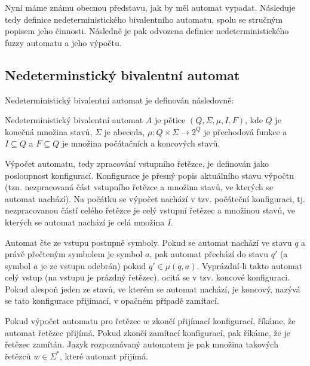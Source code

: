 \documentclass[a4paper,10pt]{article}
\begin{document}
Nyní máme známu obecnou představu, jak by měl automat vypadat. Následuje tedy definice nedeterministického bivalentního automatu, spolu se stručným popisem jeho činnosti. Následně je pak odvozena definice nedeterministického fuzzy automatu a jeho výpočtu.


\subsection{Nedeterminstický bivalentní automat}
Nedeterministický bivalentní automat je definován následovně:

\begin{definition}\label{def-NedBivAut}
 Nedeterministický bivalentní automat $A$ je pětice $(Q, \Sigma, \mu, I, F)$, kde $Q$ je konečná množina stavů, $\Sigma$ je abeceda, $\mu: Q \times \Sigma \rightarrow 2^Q$ je přechodová funkce a $I \subseteq Q$ a $F \subseteq Q$ je množina počátačních a koncových stavů.
\end{definition}


Výpočet automatu, tedy zpracování vstupního řetězce, je definován jako posloupnost konfigurací. Konfigurace je přesný popis aktuálního stavu výpočtu (tzn. nezpracovaná část vstupního řetězce a množina stavů, ve kterých se automat nachází). Na počátku se výpočet nachází v tzv. počáteční konfiguraci, tj. nezpracovanou částí celého řetězce je celý vstupní řetězec a množinou stavů, ve kterých se automat nachází je celá množina $I$.

Automat čte ze vstupu postupně symboly. Pokud se automat nachází ve stavu $q$ a právě přečteným symbolem je symbol $a$, pak automat přechází do stavu $q'$ (a symbol $a$ je ze vstupu odebrán) pokud $q' \in \mu(q, a)$. Vyprázdní-li takto automat celý vstup (na vstupu je prázdný řetězec), ocitá se v tzv. koncové konfiguraci. Pokud alespoň jeden ze stavů, ve kterém se automat nachází, je koncový, nazývá se tato konfigurace přijímací, v opačném případě zamítací.

Pokud výpočet automatu pro řetězec $w$ zkončí přijímací konfigurací, říkáme, že automat řetězec přijímá. Pokud zkončí zamítací konfigurací, pak říkáme, že je řetězec zamítán. Jazyk rozpoznávaný automatem je pak množina takových řetězců $w \in \Sigma^*$, které automat přijímá.
\end{document}
